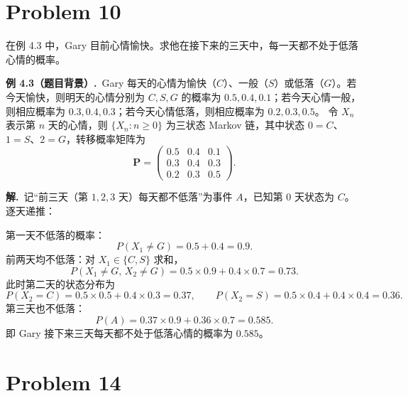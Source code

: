 \documentclass[12pt,a4paper]{article}
\begin{document}
\section{Problem 10}

在例 4.3 中，Gary 目前心情愉快。求他在接下来的三天中，每一天都不处于低落心情的概率。

\textbf{例 4.3（题目背景）.}\ Gary 每天的心情为愉快（$C$）、一般（$S$）或低落（$G$）。若今天愉快，则明天的心情分别为 $C,S,G$ 的概率为 $0.5,0.4,0.1$；若今天心情一般，则相应概率为 $0.3,0.4,0.3$；若今天心情低落，则相应概率为 $0.2,0.3,0.5$。
令 $X_n$ 表示第 $n$ 天的心情，则 $\{X_n:n\ge0\}$ 为三状态 Markov 链，其中状态 $0=C$、$1=S$、$2=G$，转移概率矩阵为
\[
\mathbf{P}=\begin{pmatrix}
0.5&0.4&0.1\\
0.3&0.4&0.3\\
0.2&0.3&0.5
\end{pmatrix}.
\]

\begin{answerbox}
\textbf{解.}\ 记“前三天（第 $1,2,3$ 天）每天都不低落”为事件 $A$，已知第 $0$ 天状态为 $C$。逐天递推：

第一天不低落的概率：
\[
P(X_1\ne G)=0.5+0.4=0.9 .
\]
前两天均不低落：对 $X_1\in\{C,S\}$ 求和，
\[
P(X_1\ne G,\,X_2\ne G)=0.5\times0.9+0.4\times0.7=0.73 .
\]
此时第二天的状态分布为
\[
P(X_2=C)=0.5\times0.5+0.4\times0.3=0.37,\qquad
P(X_2=S)=0.5\times0.4+0.4\times0.4=0.36 .
\]
第三天也不低落：
\[
P(A)=0.37\times0.9+0.36\times0.7=\boxed{0.585} .
\]
即 Gary 接下来三天每天都不处于低落心情的概率为 $0.585$。
\end{answerbox}

\section{Problem 14}
\end{document}
